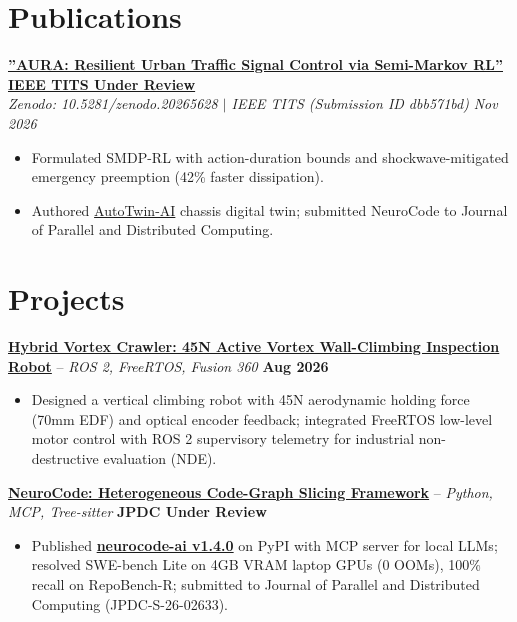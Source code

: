 \documentclass[letterpaper,10pt]{article}
\begin{document}
\section{Publications}
\noindent
\href{https://doi.org/10.5281/zenodo.20265628}{\textbf{''AURA: Resilient Urban Traffic Signal Control via Semi-Markov RL''}} \hfill \href{https://doi.org/10.5281/zenodo.20265628}{\textbf{IEEE TITS Under Review}} \\
\textit{Zenodo: 10.5281/zenodo.20265628 $|$ IEEE TITS (Submission ID dbb571bd)} \hfill \textit{Nov 2026} \\
\begin{itemize}
    \item Formulated SMDP-RL with action-duration bounds and shockwave-mitigated emergency preemption (42\% faster dissipation).
    \item Authored \href{https://deepak-arkz.me/projects/autotwin-ai}{AutoTwin-AI} chassis digital twin; submitted NeuroCode to Journal of Parallel and Distributed Computing.
\end{itemize}

\section{Projects}
\noindent
\href{https://github.com/Arkz-Deepak/vortex-crawler}{\textbf{Hybrid Vortex Crawler: 45N Active Vortex Wall-Climbing Inspection Robot}} -- \textit{ROS 2, FreeRTOS, Fusion 360} \hfill \textbf{Aug 2026} \\
\begin{itemize}
    \item Designed a vertical climbing robot with 45N aerodynamic holding force (70mm EDF) and optical encoder feedback; integrated FreeRTOS low-level motor control with ROS 2 supervisory telemetry for industrial non-destructive evaluation (NDE).
\end{itemize}
\vspace{3pt}

\noindent
\href{https://pypi.org/project/neurocode-ai/}{\textbf{NeuroCode: Heterogeneous Code-Graph Slicing Framework}} -- \textit{Python, MCP, Tree-sitter} \hfill \textbf{JPDC Under Review} \\
\begin{itemize}
    \item Published \href{https://pypi.org/project/neurocode-ai/}{\textbf{neurocode-ai v1.4.0}} on PyPI with MCP server for local LLMs; resolved SWE-bench Lite on 4GB VRAM laptop GPUs (0 OOMs), 100\% recall on RepoBench-R; submitted to Journal of Parallel and Distributed Computing (JPDC-S-26-02633).
\end{itemize}
\vspace{3pt}
\end{document}
